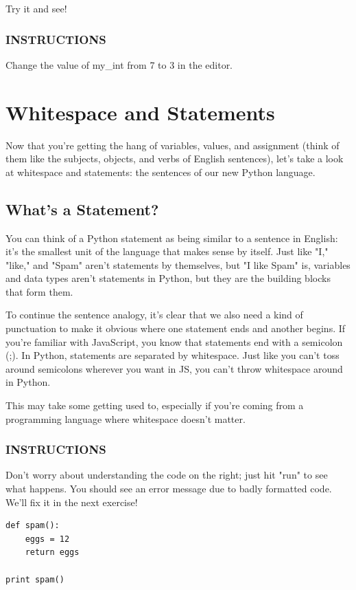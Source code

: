 \documentclass[12pt,a4paper,final,twoside,onecolumn,titlepage]{book}
\begin{document}
Try it and see!

\subsubsection{INSTRUCTIONS}
Change the value of my\_int from 7 to 3 in the editor.


\section{Whitespace and Statements}
Now that you're getting the hang of variables, values, and assignment (think of them like the subjects, objects, and verbs of English sentences), let's take a look at whitespace and statements: the sentences of our new Python language.

\subsection{What's a Statement?}
You can think of a Python statement as being similar to a sentence in English: it's the smallest unit of the language that makes sense by itself. Just like "I," "like," and "Spam" aren't statements by themselves, but "I like Spam" is, variables and data types aren't statements in Python, but they are the building blocks that form them.

To continue the sentence analogy, it's clear that we also need a kind of punctuation to make it obvious where one statement ends and another begins. If you're familiar with JavaScript, you know that statements end with a semicolon (;). In Python, statements are separated by whitespace. Just like you can't toss around semicolons wherever you want in JS, you can't throw whitespace around in Python.

This may take some getting used to, especially if you're coming from a programming language where whitespace doesn't matter.

\subsubsection{INSTRUCTIONS}
Don't worry about understanding the code on the right; just hit "run" to see what happens.
You should see an error message due to badly formatted code. We'll fix it in the next exercise!

\begin{lstlisting}
def spam():
	eggs = 12
	return eggs
        
print spam()
\end{lstlisting}
\end{document}
